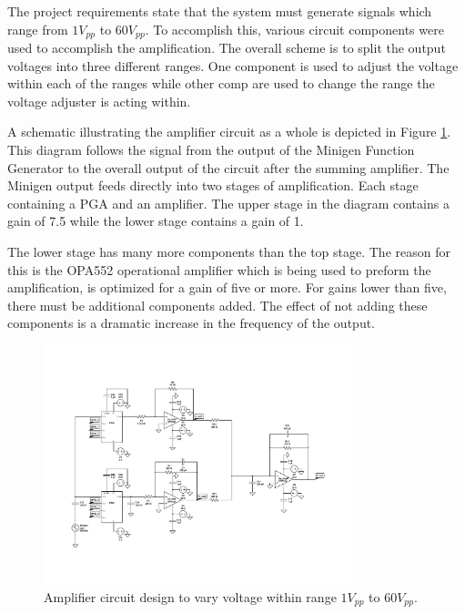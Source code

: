 \documentclass{article}	%
\begin{document}
\begin{multicols}{2}
The project requirements state that the system must 
generate signals which range from $1V_{pp}$ to $60V_{pp}$. 
To accomplish this,
various circuit components were used to accomplish the amplification.
The overall scheme is to split the output voltages into
three different ranges.
One component is used to adjust the voltage within each of the ranges while
other comp are used to change the range the voltage adjuster is acting within.

A schematic illustrating the amplifier circuit as a whole is 
depicted in Figure \ref{figure_amplifier_circuit}.
This diagram follows the signal from
the output of the Minigen Function Generator to
the overall output of the circuit after the summing amplifier.
The Minigen output feeds directly into two stages of amplification.
Each stage containing a PGA and an amplifier.
The upper stage in the diagram contains a gain of 7.5 while
the lower stage contains a gain of 1.

The lower stage has many more components than the top stage.
The reason for this is the OPA552 operational amplifier which is
being used to preform the amplification,
is optimized for a gain of five or more.
For gains lower than five,
there must be additional components added.
The effect of not adding these components is a dramatic
increase in the frequency of the output.

\begin{figure}[!hbt]
\begin{center}
\includegraphics[width=0.8\textwidth,keepaspectratio]{circuit_diagram.pdf}
\end{center}
\caption{Amplifier circuit design to vary voltage 
    within range $1V_{pp}$ to $60V_{pp}$. }
\label{figure_amplifier_circuit}
\end{figure}


\end{multicols}
\end{document}
